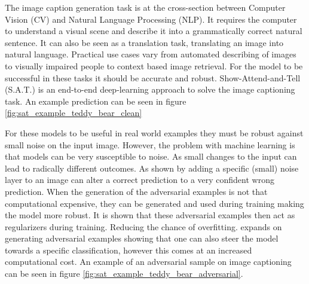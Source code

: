 
The image caption generation task is at the cross-section between Computer Vision (CV) and Natural Language Processing (NLP). It requires the computer to understand a visual scene and describe it into a grammatically correct natural sentence. It can also be seen as a translation task, translating an image into natural language. Practical use cases vary from automated describing of images to visually impaired people \cite{mazzoni_2019} to context based image retrieval. For the model to be successful in these tasks it should be accurate and robust. Show-Attend-and-Tell (S.A.T.) \cite{xu2016show} is an end-to-end deep-learning approach to solve the image captioning task. An example prediction can be seen in figure \ref{fig:sat_example_teddy_bear_clean}

For these models to be useful in real world examples they must be robust against small noise on the input image. However, the problem with machine learning is that models can be very susceptible to noise. As small changes to the input can lead to radically different outcomes. As shown by \citeauthor{goodfellow2015explaining} adding a specific (small) noise layer to an image can alter a correct prediction to a very confident wrong prediction. When the generation of the adversarial examples is not that computational expensive, they can be generated and used during training making the model more robust. It is shown that these adversarial examples then act as regularizers during training. Reducing the chance of overfitting. \citeauthor{Kurakin} expands on generating adversarial examples showing that one can also steer the model towards a specific classification, however this comes at an increased computational cost. An example of an adversarial sample on image captioning can be seen in figure \ref{fig:sat_example_teddy_bear_adversarial}.

